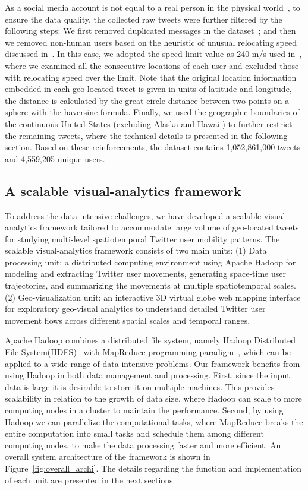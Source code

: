 \documentclass[ijgi,article,accept,moreauthors,pdftex,10pt,a4paper]{mdpi}
\theoremstyle{mdpi}
\newcounter{ex}
\newcounter{re}
\theoremstyle{mdpidefinition}
\begin{document}
As a social media account is not equal to a real person in the physical world~\cite{tsou2015}, to ensure the data quality, the collected raw tweets were further filtered by the following steps: We first removed duplicated messages in the dataset~\cite{black2012twitter}; and then we removed non-human users based on the heuristic of unusual relocating speed discussed in~\cite{hawelka2014geo,Jurdak2015}. 
In this case, we adopted the speed limit value as 240 m/s used in~\cite{Jurdak2015}, where we examined all the consecutive locations of each user and excluded those with relocating speed over the limit.
Note that the original location information embedded in each geo-located tweet is given in units of latitude and longitude, the distance is calculated by the great-circle distance between two points on a sphere with the haversine formula.
Finally, we used the geographic boundaries of the continuous United States (excluding Alaska and Hawaii) to further restrict the remaining tweets, where the technical details is presented in the following section. Based on these reinforcements, the dataset contains 1,052,861,000 tweets and 4,559,205 unique users.

\subsection{A scalable visual-analytics framework}
To address the data-intensive challenges, we have developed a scalable visual-analytics framework tailored to accommodate large volume of geo-located tweets for studying multi-level spatiotemporal Twitter user mobility patterns.
The scalable visual-analytics framework consists of two main units: (1) Data processing unit: a distributed computing environment using Apache Hadoop for modeling and extracting Twitter user movements, generating space-time user trajectories, and summarizing the movements at multiple spatiotemporal scales.
(2) Geo-visualization unit: an interactive 3D virtual globe web mapping interface for exploratory geo-visual analytics to understand detailed Twitter user movement flows across different spatial scales and temporal ranges. 

Apache Hadoop combines a distributed file system, namely Hadoop Distributed File System(HDFS)~\cite{shvachko2010hadoop} with MapReduce programming paradigm~\cite{dean2008mapreduce}, which can be applied to a wide range of data-intensive problems.
Our framework benefits from using Hadoop in both data management and processing.
First, since the input data is large it is desirable to store it on multiple machines.
This provides scalability in relation to the growth of data size, where Hadoop can scale to more computing nodes in a cluster to maintain the performance.
Second, by using Hadoop we can parallelize the computational tasks, where MapReduce breaks the entire computation into small tasks and schedule them among different computing nodes, to make the data processing faster and more efficient.
An overall system architecture of the framework is shown in Figure~\ref{fig:overall_archi}.
The details regarding the function and implementation of each unit are presented in the next sections.
\end{document}
